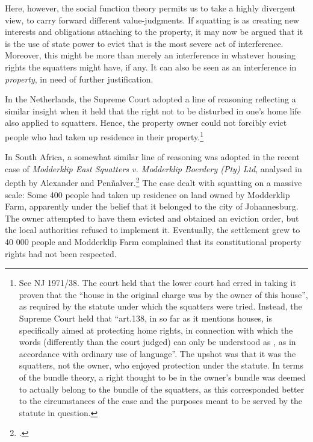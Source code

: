 Here, however, the social function theory permits us to take a highly divergent view, to carry forward different value-judgments.
If squatting is  as creating new interests and obligations attaching to the property, it may now be argued that it is the use of state power to evict that is the most severe act of interference. Moreover, this might be more than merely an interference in whatever housing rights the squatters might have, if any. It can also be seen as an interference in {\it property}, in need of further justification. 

In the Netherlands, the Supreme Court adopted a line of reasoning reflecting a similar insight when it held that the right not to be disturbed in one's home life also applied to squatters. Hence, the property owner could not forcibly evict people who had taken up residence in their property.\footnote{See NJ 1971/38. The court held that the lower court had erred in taking it proven that the ``house in the original charge was  by the owner of this house'', as required by the statute under which the squatters were tried. Instead, the Supreme Court held that ``art.138, in so far as it mentions houses, is specifically aimed at protecting home rights, in connection with which the words  (differently than the court judged) can only be understood as , as in accordance with ordinary use of language''. The upshot was that it was the squatters, not the owner, who enjoyed protection under the statute. In terms of the bundle theory, a right thought to be in the owner's bundle was deemed to actually belong to the bundle of the squatters, as this corresponded better to the circumstances of the case and the purposes meant to be served by the statute in question.}

In South Africa, a somewhat similar line of reasoning was adopted in the recent case of {\it Modderklip East Squatters v. Modderklip Boerdery (Pty) Ltd}, analysed in depth by Alexander and Pen\~{n}alver.\footcite[154-160]{alexander11} The case dealt with squatting on a massive scale: Some 400 people had taken up residence on land owned by Modderklip Farm, apparently under the belief that it belonged to the city of Johannesburg. The owner attempted to have them evicted and obtained an eviction order, but the local authorities refused to implement it. Eventually, the settlement grew to 40 000 people and Modderklip Farm complained that its constitutional property rights had not been respected.

